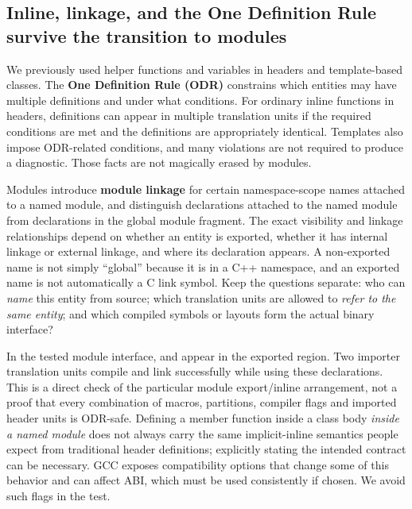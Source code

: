 \subsection{Inline, linkage, and the One Definition Rule survive the transition to modules}\label{01-foundations-i-ch006-inline-linkage-and-the-one-definition-rule-survive-the-transition-to-modules}

\hypertarget{01-foundations-i-ch006-inline-linkage-and-the-one-definition-rule-survive-the-transition-to-modules}{}

We previously used  helper functions and variables in headers and template-based classes. The \textbf{One Definition Rule (ODR)} constrains which entities may have multiple definitions and under what conditions. For ordinary inline functions in headers, definitions can appear in multiple translation units if the required conditions are met and the definitions are appropriately identical. Templates also impose ODR-related conditions, and many violations are not required to produce a diagnostic. Those facts are not magically erased by modules.

Modules introduce \textbf{module linkage} for certain namespace-scope names attached to a named module, and distinguish declarations attached to the named module from declarations in the global module fragment. The exact visibility and linkage relationships depend on whether an entity is exported, whether it has internal linkage or external linkage, and where its declaration appears. A non-exported name is not simply ``global'' because it is in a C++ namespace, and an exported name is not automatically a C link symbol. Keep the questions separate: who can \emph{name} this entity from source; which translation units are allowed to \emph{refer to the same entity}; and which compiled symbols or layouts form the actual binary interface?

In the tested module interface,  and  appear in the exported region. Two importer translation units compile and link successfully while using these declarations. This is a direct check of the particular module export/inline arrangement, not a proof that every combination of macros, partitions, compiler flags and imported header units is ODR-safe. Defining a member function inside a class body \emph{inside a named module} does not always carry the same implicit-inline semantics people expect from traditional header definitions; explicitly stating the intended  contract can be necessary. GCC exposes compatibility options that change some of this behavior and can affect ABI, which must be used consistently if chosen. We avoid such flags in the test.

